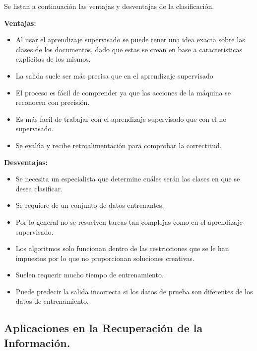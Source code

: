 \documentclass{llncs}
\begin{document}
		Se listan a continuaci\'on las ventajas y desventajas de la clasificaci\'on.
		
			\smallskip
			 \textbf{Ventajas:}
				\begin{itemize}
					\item Al usar el aprendizaje supervisado se puede tener una idea exacta sobre las clases de los documentos, dado que estas se crean en base a caracter\'isticas expl\'icitas de los mismos. 
					\item La salida suele ser m\'as precisa que en el aprendizaje supervisado
					\item El proceso es f\'acil de comprender ya que las acciones de la m\'aquina se reconocen con precisi\'on.
					\item Es m\'as facil de trabajar con el aprendizaje supervisado que con el no supervisado. 
					\item Se eval\'ua y recibe retroalimentaci\'on para comprobar la correctitud. 
				\end{itemize}
		
				\smallskip
				\textbf{Desventajas:}
				\begin{itemize}
					\item Se necesita un especialista que determine cu\'ales ser\'an las clases en que se desea clasificar.
					\item Se requiere de un conjunto de datos entrenantes.
					\item Por lo general no se resuelven tareas tan complejas como en el aprendizaje supervisado.
					\item Los algoritmos solo funcionan dentro de las restricciones que se le han impuestos por lo que no proporcionan soluciones creativas.
					\item Suelen requerir mucho tiempo de entrenamiento.
					\item Puede predecir la salida incorrecta si los datos de prueba son diferentes de los datos de entrenamiento.
				\end{itemize}
				
	\subsection{Aplicaciones en la Recuperaci\'on de la Informaci\'on.} \label{App_RI}
		
\end{document}
